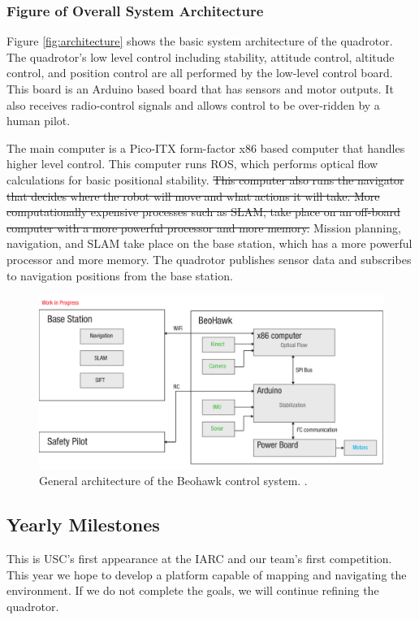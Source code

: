 \documentclass[12pt, letterpaper]{article}
\begin{document}
\subsubsection{Figure of Overall System Architecture}

Figure \eqref{fig:architecture} shows the basic system architecture of the quadrotor. The quadrotor's low level control including stability, attitude control, altitude control, and position control are all performed by the low-level control board. This board is an Arduino based board that has sensors and motor outputs. It also receives radio-control signals and allows control to be over-ridden by a human pilot.

The main computer is a Pico-ITX form-factor x86 based computer that handles higher level control. This computer runs ROS, which performs optical flow calculations for basic positional stability. \sout{This computer also runs the navigator that decides where the robot will move and what actions it will take. More computationally expensive processes such as SLAM, take place on an off-board computer with a more powerful processor and more memory.} Mission planning, navigation, and SLAM take place on the base station, which has a more powerful processor and more memory. The quadrotor publishes sensor data and subscribes to navigation positions from the base station.

\begin{figure}[h]
\centering
\includegraphics[width=14cm]{images/beohawk-system-arch.pdf}
\caption{General architecture of the Beohawk control system. .} 
\label{fig:architecture}
\end{figure}

\subsection{Yearly Milestones}
This is USC's first appearance at the IARC and our team's first competition. This year we hope to develop a platform capable of mapping and navigating the environment.  If we do not complete the goals, we will continue refining the quadrotor. 
\end{document}
